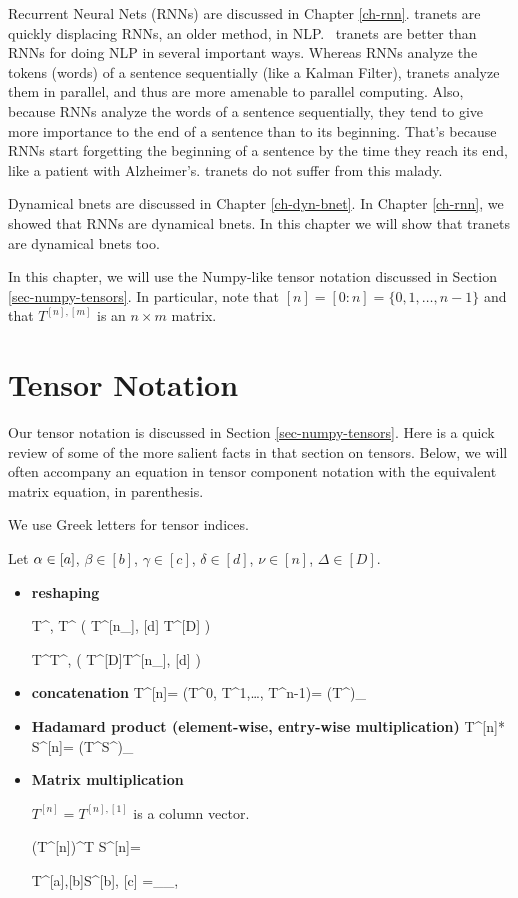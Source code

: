 Recurrent Neural Nets (RNNs)
are discussed in Chapter \ref{ch-rnn}.
tranets are quickly displacing RNNs, 
an older method, in NLP.  tranets are better than RNNs 
for doing NLP in several important ways. Whereas
 RNNs analyze the tokens (words) of a sentence 
sequentially (like a Kalman Filter), 
tranets analyze them in parallel, and thus are more
 amenable to parallel computing. Also, because
 RNNs analyze the words of a sentence sequentially, 
they tend to give more importance to the end 
of a sentence than to its beginning. That's because 
RNNs start forgetting the beginning of a sentence
 by the time they reach its end, like a patient 
with Alzheimer's. tranets do not suffer from this malady.

Dynamical bnets are discussed in Chapter \ref{ch-dyn-bnet}.
In Chapter \ref{ch-rnn},
we showed that RNNs
are dynamical bnets.
In this chapter
 we will show that tranets
are dynamical bnets too.


In this chapter, we 
will use the Numpy-like tensor notation
discussed in Section 
\ref{sec-numpy-tensors}. In particular, note that $[n] = [0:n] = \{0, 1,\ldots, n-1\}$ and that $T^{[n], [m]}$ is an $n\times m$ matrix.

\section{Tensor Notation}
Our tensor notation is discussed in Section
\ref{sec-numpy-tensors}.
Here is a quick review
of some of the more salient
facts in that section on tensors.
Below, we will often accompany
  an equation in tensor
  component notation
  with the equivalent matrix equation,
  in parenthesis.
  
We use  
Greek letters for 
tensor indices.

Let $\alpha\in[a]$, $\beta\in[b]$, $\gamma\in[c]$,
$\delta \in[d]$,
$\nu\in[n]$, $\Delta\in[D]$.


\begin{itemize}

\item{\bf reshaping}

\beq
T^{\nu, \delta}\rarrow T^{\Delta}
\;\;
\left(
T^{[n_\rvh], [d]} \rarrow T^{[D]}
\right)
\eeq

\beq
T^{\Delta}\rarrow T^{\nu, \delta}
\;\;
\left(
T^{[D]}\rarrow T^{[n_\rvh], [d]}
\right)
\eeq

\item {\bf concatenation}
\beq
T^{[n]}= (T^0, T^1,\ldots, T^{n-1})=
(T^\nu)_{\nu\in[n]}
\eeq

\item {\bf Hadamard product (element-wise, entry-wise multiplication)}
\beq
T^{[n]}* S^{[n]}= (T^\nu S^\nu)_{\nu\in[n]}
\eeq


\item {\bf Matrix multiplication}

$T^{[n]}= T^{[n], [1]}$ is a column vector.

\beq
(T^{[n]})^T S^{[n]}=
\eeq

\beq
T^{[a],[b]}S^{[b], [c]}
=
_{\alp_\in [a], \gamma \in [c]}
\eeq

\end{itemize}


